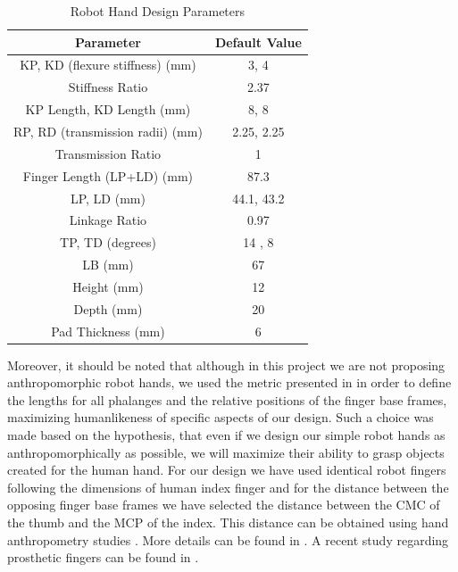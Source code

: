 \begin{table}[h!]
\setlength{\belowcaptionskip}{-4pt}
\setlength{\abovecaptionskip}{-4pt}
\caption{Robot Hand Design Parameters} 
\label{Parameters}
\begin{center}
	\begin{tabular}{ | c | c | }
	\hline
	{\bf{Parameter}} & {\bf{Default Value}} \\ \hline
	KP, KD (flexure stiffness) (mm) &  3, 4 \\ \hline
	Stiffness Ratio & 2.37 \\ \hline
	KP Length, KD Length (mm) & 8, 8 \\ \hline
	RP, RD (transmission radii) (mm) & 2.25, 2.25 \\ \hline
	Transmission Ratio & 1 \\ \hline
	Finger Length (LP+LD) (mm) &  87.3 \\ \hline
	LP, LD (mm) & 44.1, 43.2 \\ \hline
	Linkage Ratio & 0.97 \\ \hline
	TP, TD (degrees) & 14 , 8 \\ \hline
	LB (mm) &  67\\ \hline
	Height (mm) &  12 \\ \hline
	Depth (mm) &  20 \\ \hline
	Pad Thickness (mm) & 6\\ \hline
    	\end{tabular}
\end{center}
\end{table}

Moreover, it should be noted that although in this project we are not proposing anthropomorphic robot hands, we used the metric presented in \cite{Liarokapis2013ICRA} in order to define the lengths for all phalanges and the relative positions of the finger base frames, maximizing humanlikeness of specific aspects of our design. Such a choice was made based on the hypothesis, that even if we design our simple robot hands as anthropomorphically as possible, we will maximize their ability to grasp objects created for the human hand. For our design we have used identical robot fingers following the dimensions of human index finger and for the distance between the opposing finger base frames we have selected the distance between the CMC of the thumb and the MCP of the index. This distance can be obtained using hand anthropometry studies \cite{BuchholzErgonomics1992}. More details can be found in \cite{Zisimatos2014IROS}. A recent study regarding prosthetic fingers can be found in \cite{Liarokapis2014EMBC}. 

